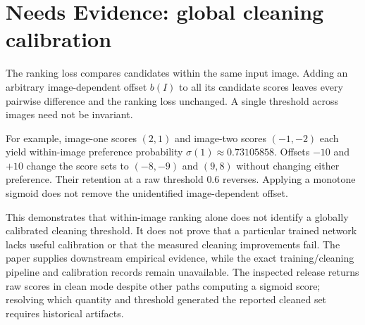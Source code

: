 \documentclass[10pt]{article}
\begin{document}
\section*{Needs Evidence: global cleaning calibration}
The ranking loss compares candidates within the same input image. Adding an arbitrary image-dependent offset \(b(I)\) to all its candidate scores leaves every pairwise difference and the ranking loss unchanged. A single threshold across images need not be invariant.\par
For example, image-one scores \((2,1)\) and image-two scores \((-1,-2)\) each yield within-image preference probability \(\sigma(1)\approx0.73105858\). Offsets \(-10\) and \(+10\) change the score sets to \((-8,-9)\) and \((9,8)\) without changing either preference. Their retention at a raw threshold \(0.6\) reverses. Applying a monotone sigmoid does not remove the unidentified image-dependent offset.\par
This demonstrates that within-image ranking alone does not identify a globally calibrated cleaning threshold. It does not prove that a particular trained network lacks useful calibration or that the measured cleaning improvements fail. The paper supplies downstream empirical evidence, while the exact training/cleaning pipeline and calibration records remain unavailable. The inspected release returns raw scores in clean mode despite other paths computing a sigmoid score; resolving which quantity and threshold generated the reported cleaned set requires historical artifacts.\par
\end{document}
